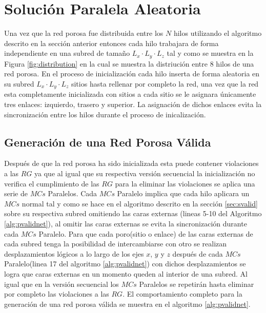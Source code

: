 \section{Solución Paralela Aleatoria}
\label{sec:pbiasedrg}
Una vez que la red porosa fue distribuida entre los $N$ hilos utilizando el algoritmo descrito en la sección anterior entonces cada hilo trabajara de forma independiente en una subred de tamaño $L_x \cdot L_y \cdot L_z$ tal y como se muestra en la Figura \ref{fig:distribution} en la cual se muestra la distriuci\'on entre $8$ hilos de una red porosa. En el proceso de inicializaci\'on cada hilo inserta de forma aleatoria en su subred $L_x \cdot L_y \cdot L_z$ sitios hasta rellenar por completo la red, una vez que la red esta completamente inicializada con sitios a cada sitio se le asignara únicamente tres enlaces: izquierdo, trasero y superior. La asignación de dichos enlaces evita la sincronización entre los hilos durante el proceso de inicalización.

\subsection{Generación de una Red Porosa Válida}
\label{subsec:pbiasedrgvalid}
Después de que la red porosa ha sido inicializada esta puede contener violaciones a las $RG$ ya que al igual que su respectiva versi\'on secuencial la inicializaci\'on no verifica el cumplimiento de las $RG$ para la eliminar las violaciones se aplica una serie de $MCs$ Paralelos. Cada $MCs$ Paralelo implica que cada hilo aplicara un $MCs$ normal tal y como se hace en el algoritmo descrito en la secci\'on \ref{sec:svalid} sobre su respectiva subred omitiendo las caras externas (lineas 5-10 del Algoritmo \ref{alg:pvalidnet}), al omitir las caras externas se evita la sincronizaci\'on durante cada $MCs$ Paralelo. Para que cada poro(sitio o enlace) de las caras externas de cada subred tenga la posibilidad de intercambiarse con otro se realizan desplazamientos lógicos a lo largo de los ejes $x$, $y$ y $z$ después de cada $MCs$ Paralelo(linea 17 del algoritmo \ref{alg:pvalidnet}) con dichos desplazamientos se logra que caras externas en un momento queden al interior de una subred. Al igual que en la versi\'on secuencial los $MCs$ Paralelos se repetirán hasta eliminar por completo las violaciones a las $RG$. El comportamiento completo para la generación de una red porosa v\'alida se muestra en el algoritmo \ref{alg:pvalidnet}.\\

